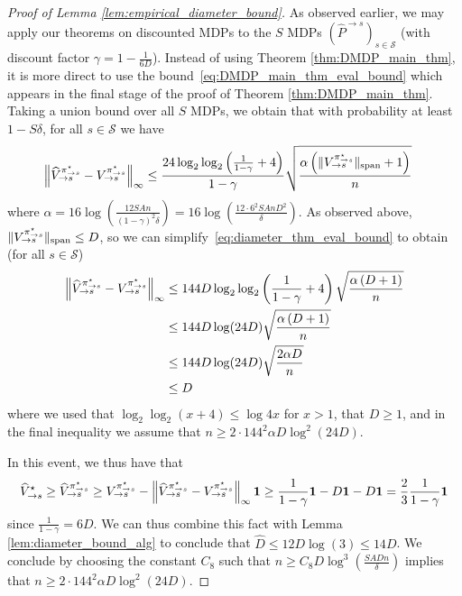 \documentclass{article}
\theoremstyle{plain}
\theoremstyle{plain}
\theoremstyle{remark}
\theoremstyle{plain}
\theoremstyle{plain}
\newcommand{\Phat}{\widehat{P}}
\newcommand{\Vhat}{\widehat{V}}
\newcommand{\pistar}{\pi^\star}
\newcommand{\one}{\mathbf{1}}
\renewcommand{\S}{\mathcal{S}}
\begin{document}
\begin{proof}[Proof of Lemma \ref{lem:empirical_diameter_bound}]
As observed earlier, we may apply our theorems on discounted MDPs to the $S$ MDPs $(\Phat^{\to s})_{s \in \S}$ (with discount factor $\gamma = 1 - \frac{1}{6D}$). Instead of using Theorem \ref{thm:DMDP_main_thm}, it is more direct to use the bound~\eqref{eq:DMDP_main_thm_eval_bound} which appears in the final stage of the proof of Theorem \ref{thm:DMDP_main_thm}. Taking a union bound over all $S$ MDPs, we obtain that with probability at least $1 -  S \delta$, for all $s \in \S$ we have
\begin{align}
        \infnorm{ \Vhat_{\to s}^{\pistar_{\to s}} - V_{\to s}^{\pistar_{\to s}} }
        & \leq \frac{24 \log_2 \log_2 \left( \frac{1}{1-\gamma} + 4\right)  }{1-\gamma}\sqrt{\frac{ \alpha \left( \spannorm{V_{\to s}^{\pistar_{\to s}}} + 1\right)}{n}}\label{eq:diameter_thm_eval_bound}
\end{align}
where $\alpha = 16 \log \left(\frac{12 SA n}{(1-\gamma)^2\delta}  \right) = 16 \log \left(\frac{12 \cdot 6^2 SA n D^2}{\delta}  \right)$. As observed above, $\spannorm{V_{\to s}^{\pistar_{\to s}}} \leq D$, so we can simplify~\eqref{eq:diameter_thm_eval_bound} to obtain (for all $s \in \S$)
\begin{align*}
    \infnorm{ \Vhat_{\to s}^{\pistar_{\to s}} - V_{\to s}^{\pistar_{\to s}} }
        & \leq 144 D \log_2 \log_2 \left( \frac{1}{1-\gamma} + 4\right)\sqrt{\frac{ \alpha \left( D + 1\right)}{n}} \\
        & \leq 144 D \log(24 D)\sqrt{\frac{ \alpha \left( D + 1\right)}{n}} \\
        & \leq  144 D \log(24 D) \sqrt{\frac{ 2\alpha D}{n}} \\
        & \leq D
\end{align*}
where we used that $\log_2 \log_2 (x+4) \leq \log 4x$ for $x > 1$, that $D\geq 1$, and in the final inequality we assume that $n \geq  2 \cdot 144^2 \alpha D \log^2(24D)$.

In this event, we thus have that
\begin{align*}
    \Vhat^\star_{\to s} \geq \Vhat^{\pistar_{\to s}}_{\to s} \geq V^{\pistar_{\to s}}_{\to s} - \infnorm{\Vhat^{\pistar_{\to s}}_{\to s} - V^{\pistar_{\to s}}_{\to s}} \one \geq \frac{1}{1-\gamma}\one - D\one - D\one = \frac{2}{3} \frac{1}{1-\gamma}\one
\end{align*}
since $\frac{1}{1-\gamma} = 6D$. We can thus combine this fact with Lemma \ref{lem:diameter_bound_alg} to conclude that $\widehat{D} \leq 12 D \log(3) \leq 14 D$. We conclude by choosing the constant $C_8$ such that $n \geq C_8 D \log^3 \left(\frac{SADn}{\delta} \right)$ implies that $n \geq  2 \cdot 144^2 \alpha D \log^2(24D)$.
\end{proof}
\end{document}
